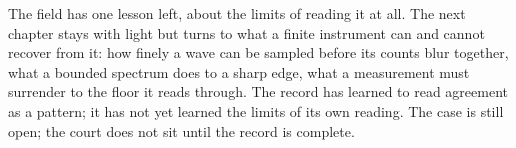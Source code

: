 The field has one lesson left, about the limits of reading it at all. The next chapter stays with light but
turns to what a finite instrument can and cannot recover from it: how finely a wave can be sampled before its
counts blur together, what a bounded spectrum does to a sharp edge, what a measurement must surrender to the
floor it reads through. The record has learned to read agreement as a pattern; it has not yet learned the
limits of its own reading. The case is still open; the court does not sit until the record is complete.
